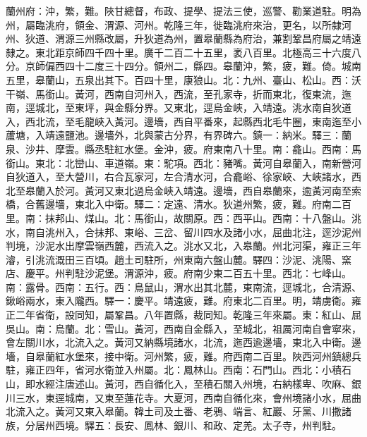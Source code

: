 \begin{pinyinscope}
蘭州府：沖，繁，難。陜甘總督，布政、提學、提法三使，巡警、勸業道駐。明為州，屬臨洮府，領金、渭源、河州。乾隆三年，徙臨洮府來治，更名，以所隸河州、狄道、渭源三州縣改屬，升狄道為州，置皋蘭縣為府治，兼割鞏昌府屬之靖遠隸之。東北距京師四千四十里。廣千二百二十五里，袤八百里。北極高三十六度八分。京師偏西四十二度三十四分。領州二，縣四。皋蘭沖，繁，疲，難。倚。城南五里，皋蘭山，五泉出其下。百四十里，康狼山。北：九州、臺山、松山。西：沃干嶺、馬銜山。黃河，西南自河州入，西流，至孔家寺，折而東北，復東流，迤南，逕城北，至東坪，與金縣分界。又東北，逕烏金峽，入靖遠。洮水南自狄道入，西北流，至毛龍峽入黃河。邊墻，西自平番來，起縣西北毛牛圈，東南迤至小蘆塘，入靖遠鹽池。邊墻外，北與蒙古分界，有界碑六。鎮一：納米。驛三：蘭泉、沙井、摩雲。縣丞駐紅水堡。金沖，疲。府東南八十里。南：龕山。西南：馬銜山。東北：北巒山、車道嶺。東：駝項。西北：豬嘴。黃河自皋蘭入，南新營河自狄道入，至大營川，右合瓦家河，左合清水河，合龕峪、徐家峽、大峽諸水，西北至皋蘭入於河。黃河又東北過烏金峽入靖遠。邊墻，西自皋蘭來，逾黃河南至索橋，合舊邊墻，東北入中衛。驛二：定遠、清水。狄道州繁，疲，難。府南二百里。南：抹邦山、煤山。北：馬銜山，故關原。西：西平山。西南：十八盤山。洮水，南自洮州入，合抹邦、東峪、三岔、留川四水及諸小水，屈曲北注，逕沙泥州判境，沙泥水出摩雲嶺西麓，西流入之。洮水又北，入皋蘭。州北河渠，雍正三年濬，引洮流溉田三百頃。趙土司駐所，州東南六盤山麓。驛四：沙泥、洮陽、窯店、慶平。州判駐沙泥堡。渭源沖，疲。府南少東二百五十里。西北：七峰山。南：露骨。西南：五行。西：鳥鼠山，渭水出其北麓，東南流，逕城北，合清源、鍬峪兩水，東入隴西。驛一：慶平。靖遠疲，難。府東北二百里。明，靖虜衛。雍正二年省衛，設同知，屬鞏昌。八年置縣，裁同知。乾隆三年來屬。東：紅山、屈吳山。南：烏蘭。北：雪山。黃河，西南自金縣入，至城北，祖厲河南自會寧來，會左關川水，北流入之。黃河又納縣境諸水，北流，迤西逾邊墻，東北入中衛。邊墻，自皋蘭紅水堡來，接中衛。河州繁，疲，難。府西南二百里。陜西河州鎮總兵駐，雍正四年，省河水衛並入州屬。北：鳳林山。西南：石門山。西北：小積石山，即水經注唐述山。黃河，西自循化入，至積石關入州境，右納樣卑、吹麻、銀川三水，東逕城南，又東至蓮花寺。大夏河，西南自循化來，會州境諸小水，屈曲北流入之。黃河又東入皋蘭。韓土司及土番、老鴉、端言、紅巖、牙黨、川撒諸族，分居州西境。驛五：長安、鳳林、銀川、和政、定羌。太子寺，州判駐。


\end{pinyinscope}
